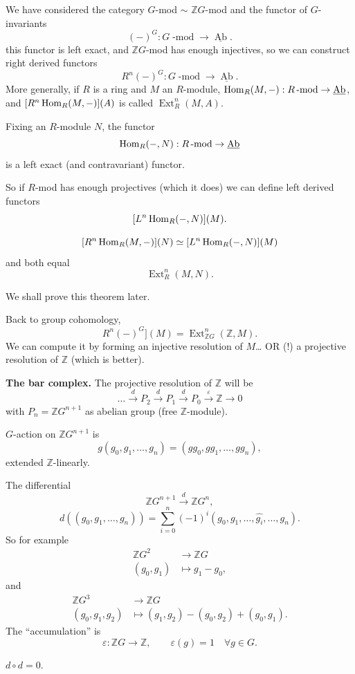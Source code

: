 \noindent
We have considered the category
$G$-mod $\sim$ $\mathbb{Z}G$-mod and the
functor of $G$-invariants
$$
(-)^G : G\operatorname{-mod}
\to
\underline{\operatorname{Ab}}.
$$
this functor is left exact, and
$\mathbb{Z}G$-mod has enough injectives,
so we can construct right derived functors
$$
R^n(-)^G: G\operatorname{-mod}
\to \underline{\operatorname{Ab}}.
$$
More generally, if $R$ is a ring and
$M$ an $R$-module,
$\mathop{\mathrm{Hom}}\nolimits_R(M,-):R\operatorname{-mod}
\to \underline{ \operatorname{Ab}}$,
and 
$[R^n\mathop{\mathrm{Hom}}\nolimits_R(M,-)](A)$
is called $\operatorname{Ext}^n_R(M,A)$.

\begin{remark}
\label{remark-hom-functor-contravariant}
Fixing an $R$-module $N$,
the functor
$$
\mathop{\mathrm{Hom}}\nolimits_R(-,N):R\operatorname{-mod}
\to \underline{\operatorname{Ab}}
$$
is a left exact (and contravariant)
functor.
\end{remark}

\noindent
So if $R$-mod has enough projectives
(which it does) we can define left
derived functors
$$
[L^n\mathop{\mathrm{Hom}}\nolimits_R(-,N)](M).
$$

\begin{theorem}[Balancing]
\label{theorem-balancing}
$$
[R^n\mathop{\mathrm{Hom}}\nolimits_R(M,-)](N)
\simeq
[L^n\mathop{\mathrm{Hom}}\nolimits_R(-,N)](M)
$$
and both equal
$$
\operatorname{Ext}^n_R(M,N).
$$
\end{theorem}

\noindent
We shall prove this theorem later.

\medskip\noindent
Back to group cohomology,
$$
R^n(-)^G](M)
=
\operatorname{Ext}^n_{\mathbb{Z} G}
(\mathbb{Z},M).
$$
We can compute it by forming an injective
resolution of $M$… OR (!)
a projective resolution of $\mathbb{Z}$
(which is better).



\medskip\noindent
{\bf The bar complex.}
The projective resolution of $\mathbb{Z}$
will be
$$
… \xrightarrow{d}P_2
\xrightarrow{d}P_1
\xrightarrow{d}P_0
\xrightarrow{\varepsilon}
\mathbb{Z}\to 0
$$
with $P_n=\mathbb{Z}G^{n+1}$
as abelian group (free $\mathbb{Z}$-module).

$G$-action on $\mathbb{Z}G^{n+1}$ is
$$
g(g_0,g_1,…,g_n)
=
(gg_0, g g_1,…,g g_n),
$$
extended $\mathbb{Z}$-linearly.

The differential
$$
\mathbb{Z}G^{n+1}
\xrightarrow{d}
\mathbb{Z}G^n,
$$
$$
d((g_0,g_1,…,g_n))
=
\sum_{i=0}^n
(-1)^i(g_0,g_1,…,\widehat{g_i},…,g_n).
$$
So for example
$$
\begin{aligned}
\mathbb{Z}G^2 &\longrightarrow \mathbb{Z}G \\
(g_0,g_1) &\longmapsto g_1-g_0,
\end{aligned}
$$
and
$$
\begin{aligned}
\mathbb{Z}G^3 &\longrightarrow \mathbb{Z}G \\
(g_0,g_1,g_2) &\longmapsto 
(g_1,g_2)-(g_0,g_2)+(g_0,g_1).
\end{aligned}
$$
The ``accumulation'' is
$$
\varepsilon:\mathbb{Z}G \to \mathbb{Z},
\qquad 
\varepsilon(g)=1 \quad \forall g \in G.
$$
\begin{exercise}
\label{exercise-bar-complex}
$d \circ d=0$.
\end{exercise}

